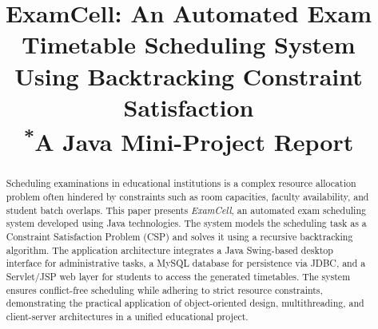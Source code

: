 \documentclass[conference]{IEEEtran}
\begin{document}
\title{ExamCell: An Automated Exam Timetable Scheduling System Using Backtracking Constraint Satisfaction \\
{\footnotesize \textsuperscript{*}A Java Mini-Project Report}
}

\author{
\and
{}
\and
{}
\and
{}
}

\maketitle

\begin{abstract}
Scheduling examinations in educational institutions is a complex resource allocation problem often hindered by constraints such as room capacities, faculty availability, and student batch overlaps. This paper presents \textit{ExamCell}, an automated exam scheduling system developed using Java technologies. The system models the scheduling task as a Constraint Satisfaction Problem (CSP) and solves it using a recursive backtracking algorithm. The application architecture integrates a Java Swing-based desktop interface for administrative tasks, a MySQL database for persistence via JDBC, and a Servlet/JSP web layer for students to access the generated timetables. The system ensures conflict-free scheduling while adhering to strict resource constraints, demonstrating the practical application of object-oriented design, multithreading, and client-server architectures in a unified educational project.
\end{abstract}
\end{document}
